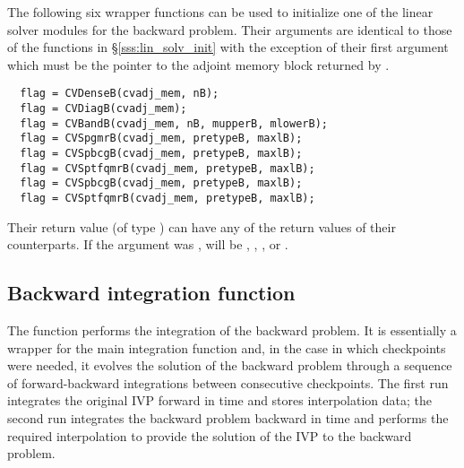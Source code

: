 The following six wrapper functions can be used to initialize one of the linear
solver modules for the backward problem. Their arguments are identical to those
of the functions in \S\ref{sss:lin_solv_init} with the exception of their first
argument which must be the pointer to the adjoint memory block returned by
.
\begin{verbatim}
  flag = CVDenseB(cvadj_mem, nB);
  flag = CVDiagB(cvadj_mem);
  flag = CVBandB(cvadj_mem, nB, mupperB, mlowerB);
  flag = CVSpgmrB(cvadj_mem, pretypeB, maxlB);
  flag = CVSpbcgB(cvadj_mem, pretypeB, maxlB);
  flag = CVSptfqmrB(cvadj_mem, pretypeB, maxlB);
  flag = CVSpbcgB(cvadj_mem, pretypeB, maxlB);
  flag = CVSptfqmrB(cvadj_mem, pretypeB, maxlB);
\end{verbatim}
Their return value  (of type ) can have any of the return values 
of their counterparts.
If the  argument was ,  will be
, , 
, or .

\subsection{Backward integration function}
\label{sss:cvodeb}

The function  performs the integration of the backward problem.
It is essentially a wrapper for the {\cvodes} main integration function 
 and, in the case in which checkpoints were needed, it evolves 
the solution of the backward problem through a sequence of forward-backward 
integrations between consecutive checkpoints. 
The first run integrates the original IVP forward in time and
stores interpolation data; the second run integrates the backward problem 
backward in time and performs the required interpolation to provide
the solution of the IVP to the backward problem.

